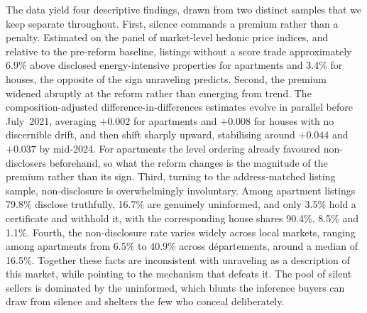 The data yield four descriptive findings, drawn from two distinct samples that we keep separate
throughout. First, silence commands a premium rather than a penalty. Estimated on the panel of
market-level hedonic price indices, and relative to the pre-reform baseline, listings without a
score trade approximately 6.9\% above disclosed energy-intensive properties for apartments and
3.4\% for houses, the opposite of the sign unraveling predicts. Second, the premium widened
abruptly at the reform rather than emerging from trend. The composition-adjusted
difference-in-differences estimates evolve in parallel before July~2021, averaging $+0.002$ for
apartments and $+0.008$ for houses with no discernible drift, and then shift sharply upward,
stabilising around $+0.044$ and $+0.037$ by mid-2024. For apartments the level ordering already
favoured non-disclosers beforehand, so what the reform changes is the magnitude of the premium
rather than its sign. Third, turning to the address-matched listing sample, non-disclosure is
overwhelmingly involuntary. Among apartment listings 79.8\% disclose truthfully, 16.7\% are
genuinely uninformed, and only 3.5\% hold a certificate and withhold it, with the corresponding
house shares 90.4\%, 8.5\% and 1.1\%.
Fourth, the non-disclosure rate varies widely across local markets, ranging among
apartments from 6.5\% to 40.9\% across d\'epartements, around a median of 16.5\%. Together
these facts are inconsistent with unraveling as a description of this market, while pointing to
the mechanism that defeats it. The pool of silent sellers is dominated by the uninformed, which
blunts the inference buyers can draw from silence and shelters the few who conceal
deliberately.
